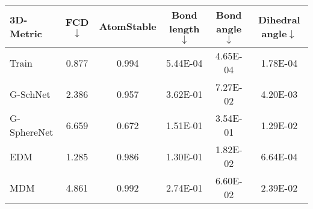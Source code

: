 \begin{tabular}{lccccccccc}
3D-Metric                      & FCD$\downarrow$              & \multicolumn{2}{c}{AtomStable}                                                & \multicolumn{2}{c}{Bond length$\downarrow$}                          & \multicolumn{2}{c}{Bond angle$\downarrow$}                  & \multicolumn{2}{c}{Dihedral angle$\downarrow$}              \\\midrule
{\color{gray}Train}   & {\color{gray}0.877} & \multicolumn{2}{c}{{\color{gray}0.994}}           & \multicolumn{2}{c}{{\color{gray}5.44E-04}}                  & \multicolumn{2}{c}{{\color{gray}4.65E-04}}         & \multicolumn{2}{c}{{\color{gray}1.78E-04}}         \\
G-SchNet                       & 2.386                        & \multicolumn{2}{c}{0.957}                                                         & \multicolumn{2}{c}{3.62E-01}                                         & \multicolumn{2}{c}{7.27E-02}                                & \multicolumn{2}{c}{4.20E-03}                                \\
G-SphereNet                    & 6.659                        & \multicolumn{2}{c}{0.672}                                                         & \multicolumn{2}{c}{1.51E-01}                                         & \multicolumn{2}{c}{3.54E-01}                                & \multicolumn{2}{c}{1.29E-02}                                \\
EDM                            & 1.285                        & \multicolumn{2}{c}{0.986}                                                         & \multicolumn{2}{c}{1.30E-01}                                         & \multicolumn{2}{c}{1.82E-02}                                & \multicolumn{2}{c}{6.64E-04}                                \\
MDM                            & 4.861                        & \multicolumn{2}{c}{0.992}                                                         & \multicolumn{2}{c}{2.74E-01}                                         & \multicolumn{2}{c}{6.60E-02}                                & \multicolumn{2}{c}{2.39E-02}                                \\

\end{tabular}
